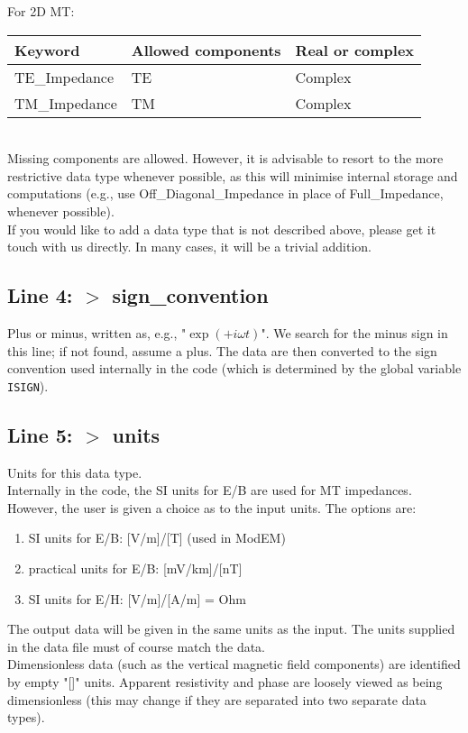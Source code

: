 \documentclass[12pt]{article}
\begin{document}
\noindent
For 2D MT:\\
\noindent
\begin{tabular}{|p{5cm}|p{7.5cm}|p{3.5cm}|}
  \hline
  Keyword & Allowed components & Real or complex \\
  \hline
  TE\_Impedance & TE & Complex \\
  TM\_Impedance & TM & Complex \\
  \hline
\end{tabular}\\

\noindent
Missing components are allowed. However, it is advisable to resort to the more restrictive data type whenever possible, as this will minimise internal storage and computations (e.g., use Off\_Diagonal\_Impedance in place of Full\_Impedance, whenever possible).\\

If you would like to add a data type that is not described above, please get it touch with us directly. In many cases, it will be a trivial addition.

\subsection*{Line 4: $>$ sign\_convention}
Plus or minus, written as, e.g., "$\exp(+i\omega t)$". We search for the minus sign in this line; if not found, assume a plus. The data are then converted to the sign convention used internally in the code (which is determined by the global variable \verb"ISIGN").

\subsection*{Line 5: $>$ units}
Units for this data type.\\
Internally in the code, the SI units for E/B are used for MT impedances. However, the user is given a choice as to the input units. The options are:
\begin{enumerate}
  \item SI units for E/B: [V/m]/[T] (used in ModEM)
  \item practical units for E/B: [mV/km]/[nT]
  \item SI units for E/H: [V/m]/[A/m] = Ohm
\end{enumerate}
The output data will be given in the same units as the input. The units supplied in the data file must of course match the data.\\
Dimensionless data (such as the vertical magnetic field components) are identified by empty "[]" units. Apparent resistivity and phase are loosely viewed as being dimensionless (this may change if they are separated into two separate data types).
\end{document}
